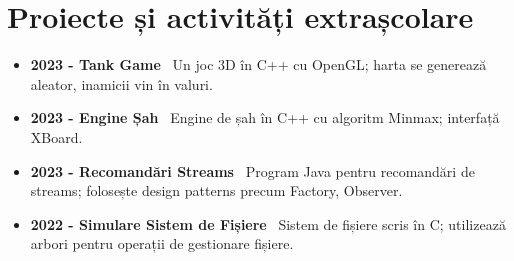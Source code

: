 \documentclass[a4paper,10pt]{article}
\begin{document}
\section*{Proiecte și activități extrașcolare}
\begin{itemize}[leftmargin=*]
    \item \textbf{2023 - Tank Game} \
    Un joc 3D în C++ cu OpenGL; harta se generează aleator, inamicii vin în valuri.
    \item \textbf{2023 - Engine Șah} \
    Engine de șah în C++ cu algoritm Minmax; interfață XBoard.
    \item \textbf{2023 - Recomandări Streams} \
    Program Java pentru recomandări de streams; folosește design patterns precum Factory, Observer.
    \item \textbf{2022 - Simulare Sistem de Fișiere} \
    Sistem de fișiere scris în C; utilizează arbori pentru operații de gestionare fișiere.
\end{itemize}
\end{document}
